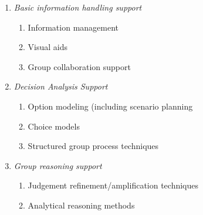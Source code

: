 \documentclass[notitlepage]{article}
\begin{document}
\begin{enumerate}[itemsep=0pt,parsep=0pt]
	\item{\textit{Basic information handling support}}
		\begin{enumerate}[itemsep=0pt,parsep=0pt,topsep=0pt, partopsep=0pt]
			\item{Information management}
			\item{Visual aids}
			\item{Group collaboration support}
		\end{enumerate}
	\item{\textit{Decision Analysis Support}}
		\begin{enumerate}[itemsep=0pt,parsep=0pt,topsep=0pt, partopsep=0pt]
			\item{Option modeling (including scenario planning \cite{borjesonScenarioTypesTechniques2006}}
			\item{Choice models}
			\item{Structured group process techniques}
		\end{enumerate}
	\item{\textit{Group reasoning support}}
		\begin{enumerate}[itemsep=0pt,parsep=0pt,topsep=0pt, partopsep=0pt]
			\item{Judgement refinement/amplification techniques}
			\item{Analytical reasoning methods}
		\end{enumerate}
\end{enumerate}





%
\end{document}
